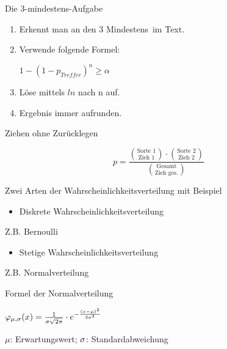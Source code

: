 \documentclass[paper=a6,landscape,ngerman,twoside=true,fontsize=12pt]{scrartcl}
\begin{document}
\begin{frage}
	Die 3-mindestens-Aufgabe
	
\end{frage}
\begin{antwort}
	\begin{enumerate}
		\item Erkennt man an den 3 \glqq Mindestens\grqq~im Text. 
		\item Verwende folgende Formel:
		
		 $1-(1-p_{Treffer})^n\geq \alpha$
		\item Löse mittels $ln$ nach  n auf.
		\item Ergebnis immer aufrunden.
	\end{enumerate}
	
\end{antwort}
\begin{frage}
	Ziehen ohne Zurücklegen
	
\end{frage}
\begin{antwort}
	\Large
	\[
	 p=\frac{\binom{\text{Sorte 1}}{\text{Zieh 1}} \cdot \binom{\text{Sorte 2}}{\text{Zieh 2}}}{\binom{\text{Gesamt}}{\text{Zieh ges.}}}
	 \]
	
\end{antwort}
\begin{frage}
	Zwei Arten der Wahrscheinlichkeitsverteilung mit Beispiel
	
\end{frage}
\begin{antwort}
	\begin{itemize}
		\item Diskrete Wahrscheinlichkeitsverteilung
	\end{itemize}
	Z.B. Bernoulli
	\begin{itemize}
		\item Stetige Wahrscheinlichkeitsverteilung
	\end{itemize}
	Z.B. Normalverteilung
\end{antwort}	
\begin{frage}
	Formel der Normalverteilung
\end{frage}
\begin{antwort}
	\begin{center}
		\Large
		$\varphi_{\mu,\sigma}(x)=\frac{1}{\sigma\sqrt{2\pi}}\cdot e^{-\frac{(x-\mu)^2}{2\sigma^2}}$
		\vspace{1cm}
		
		\normalsize
		$\mu$: Erwartungswert; $\sigma$: Standardabweichung
	\end{center}
\end{antwort}	
\end{document}
